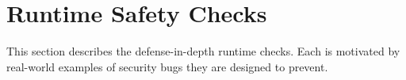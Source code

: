 \section{Runtime Safety Checks}
\label{sec:bugs}

This section describes the defense-in-depth runtime checks.
Each is motivated by real-world examples of security bugs they are designed to prevent.

%



%
%

